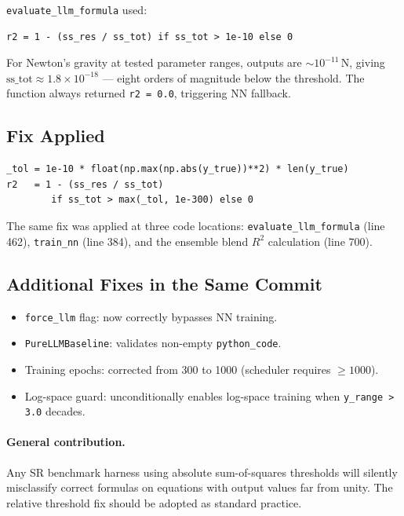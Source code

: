 \documentclass[twoside,11pt]{article}
\newcommand{\Rsq}{R^{2}}
\begin{document}
\texttt{evaluate\_llm\_formula} used:
\begin{verbatim}
r2 = 1 - (ss_res / ss_tot) if ss_tot > 1e-10 else 0
\end{verbatim}
For Newton's gravity at tested parameter ranges, outputs are $\sim 10^{-11}$\,N,
giving $\mathrm{ss\_tot} \approx 1.8 \times 10^{-18}$ — eight orders of
magnitude below the threshold.  The function always returned
\texttt{r2 = 0.0}, triggering NN fallback.

\subsection{Fix Applied}

\begin{verbatim}
_tol = 1e-10 * float(np.max(np.abs(y_true))**2) * len(y_true)
r2   = 1 - (ss_res / ss_tot)
        if ss_tot > max(_tol, 1e-300) else 0
\end{verbatim}

The same fix was applied at three code locations:
\texttt{evaluate\_llm\_formula} (line 462),
\texttt{train\_nn} (line 384), and
the ensemble blend $\Rsq$ calculation (line 700).

\subsection{Additional Fixes in the Same Commit}

\begin{itemize}
  \item \texttt{force\_llm} flag: now correctly bypasses NN training.
  \item \texttt{PureLLMBaseline}: validates non-empty \texttt{python\_code}.
  \item Training epochs: corrected from 300 to 1000 (scheduler requires $\geq 1000$).
  \item Log-space guard: unconditionally enables log-space training when
    \texttt{y\_range > 3.0} decades.
\end{itemize}

\paragraph{General contribution.}
Any SR benchmark harness using absolute sum-of-squares thresholds will
silently misclassify correct formulas on equations with output values far
from unity.  The relative threshold fix should be adopted as standard practice.

\end{document}

